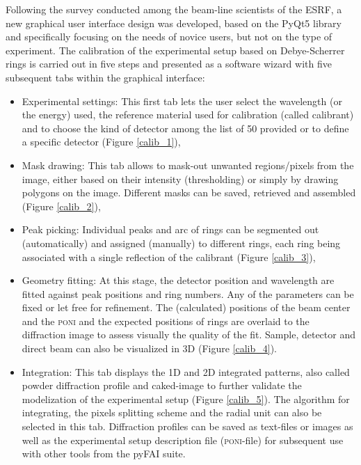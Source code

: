 \documentclass[preprint]{iucr}              %
\begin{document}
Following the survey conducted among the beam-line scientists of the ESRF, a
new graphical user interface design was developed, based on the PyQt5
library \cite{pyqt} and specifically focusing on the needs of novice users, but
not on the type of experiment.
The calibration of the experimental setup based on Debye-Scherrer rings 
is carried out in five steps and presented as a software wizard with five
subsequent tabs within the graphical interface:
\begin{itemize}
  \item{Experimental settings:} This first tab lets the user select
  the wavelength (or the energy) used, the reference material used
  for calibration (called calibrant) and to choose the kind of detector among the
  list of 50 provided or to define a specific detector (Figure \ref{calib_1}),
  \item{Mask drawing:} This tab allows to mask-out unwanted regions/pixels from the
  image, either based on their intensity (thresholding) or simply by
  drawing polygons on the image. Different masks can be saved, retrieved and assembled (Figure \ref{calib_2}),
  \item{Peak picking:} Individual peaks and arc of rings can be segmented out
  (automatically) and assigned (manually) to different rings, each ring 
  being associated with a single reflection of the calibrant (Figure
  \ref{calib_3}),
  \item{Geometry fitting:} At this stage, the detector position and
  wavelength are fitted against peak positions and ring numbers. 
  Any of the  parameters can be fixed or let free for refinement.
  The (calculated) positions of the beam center and the \textsc{poni}
  and the expected positions of rings are overlaid to the diffraction image
  to assess visually the quality of the fit. Sample, detector 
  and direct beam can also be visualized in 3D (Figure \ref{calib_4}). 
  \item{Integration:} This tab displays the 1D and 2D integrated patterns, also
  called powder diffraction profile and caked-image to further validate the
  modelization of the experimental setup (Figure \ref{calib_5}). 
  The algorithm for integrating, the pixels splitting scheme and the radial unit
  can also be selected in this tab. 
  Diffraction profiles can be saved as text-files or images as well as the
  experimental setup description file (\textsc{poni}-file) for subsequent use with other tools from
  the pyFAI suite.
\end{itemize}
\end{document}
